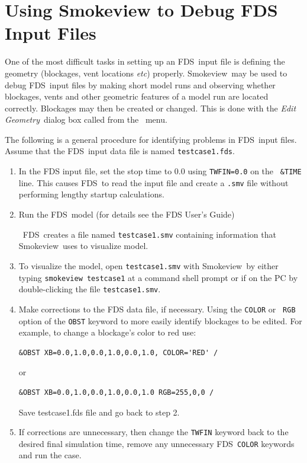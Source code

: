 \documentclass[11pt,twoside]{book}
\newcommand{\fdsinput}[1]{
{
\scriptsize

}
}
\newcommand{\FDS}{{FDS}}
\newcommand{\fds}{{FDS}}
\newcommand{\Smokeview}{{Smokeview}}
\newcommand{\smokeview}{{Smokeview}}
\newcommand{\etc}{{\em etc}}
\begin{document}
\fdsinput{sillytexture.fds}


\chapter{Using Smokeview to Debug FDS Input Files} One of the most difficult
tasks in setting up an \fds\ input file is defining the geometry
(blockages, vent locations \etc) properly. \Smokeview\ may be used
to debug \fds\ input files by making short model runs and observing
whether blockages, vents and other geometric features of a model run are
located correctly. Blockages may then be created or changed. This
is done with the {\em Edit Geometry}\ dialog box called from the
\ menu.

The following is a general procedure for identifying problems in
\fds\ input files. Assume that the \fds\ input data file is named
{\tt testcase1.fds}.
\begin{enumerate}
\item In the FDS input file, set the stop time to $0.0$ using {\tt TWFIN=0.0} on the {\tt
\&TIME} line. This causes \fds\ to read the input file and create
a {\tt .smv} file without  performing lengthy startup
calculations.

\item Run the \fds\ model
(for details see the FDS User's Guide\cite{FDS_Users_Guide_5})

\noindent\ \FDS\ creates a file named {\tt testcase1.smv}
containing information that \smokeview\ uses to visualize model.

\item To visualize the model, open {\tt testcase1.smv} with
\smokeview\ by either typing {\tt smokeview testcase1} at a
command shell prompt or if on the PC by double-clicking the file
{\tt testcase1.smv}.

\item Make corrections to the FDS data file, if necessary. Using the {\tt COLOR} or {\tt
RGB} option of the
{\tt OBST} keyword to more easily identify blockages to be edited.
For example, to change a blockage's color to red use:
\begin{verbatim}
&OBST XB=0.0,1.0,0.0,1.0,0.0,1.0, COLOR='RED' /
\end{verbatim}
\noindent or
\begin{verbatim}
&OBST XB=0.0,1.0,0.0,1.0,0.0,1.0 RGB=255,0,0 /
\end{verbatim}

\noindent Save testcase1.fds file and go back to step 2.

\item If corrections are unnecessary, then change the {\tt TWFIN}
keyword back to the desired final simulation time, remove any
unnecessary \fds\ {\tt COLOR} keywords and run the case.
\end{enumerate}
\end{document}
